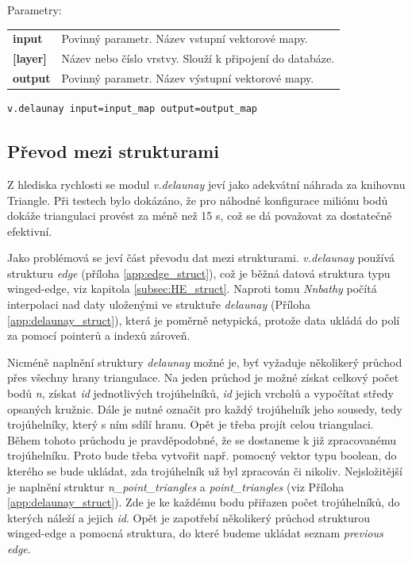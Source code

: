 \documentclass[12pt,a4paper]{article}
\begin{document}
\noindent Parametry:
\begin{tabular}{ll}
\textbf{input}& Povinný parametr. Název vstupní vektorové mapy.\\
\textbf{[layer]}& Název nebo číslo vrstvy. Slouží k připojení do databáze.\\
\textbf{output}&  Povinný parametr. Název výstupní vektorové mapy.\\
\end{tabular}

\begin{lstlisting}[caption={Volání modulu v.delaunay z příkazové řádky}]
v.delaunay input=input_map output=output_map
\end{lstlisting}

\bigskip
\subsection{Převod mezi strukturami}

Z hlediska rychlosti se modul \emph{v.delaunay} jeví jako adekvátní
náhrada za knihovnu Triangle. Při testech bylo dokázáno, že pro
náhodné konfigurace miliónu bodů dokáže triangulaci provést za méně
než 15 s, což se dá považovat za dostatečně efektivní. 

Jako problémová se jeví část převodu dat mezi
strukturami. \emph{v.delaunay} používá strukturu \emph{edge} (příloha \ref{app:edge_struct}),
což je běžná datová struktura typu winged-edge, viz kapitola \ref{subsec:HE_struct}. Naproti tomu \emph{Nnbathy} počítá interpolaci nad daty uloženými ve
struktuře \emph{delaunay} (Příloha \ref{app:delaunay_struct}), která
je poměrně netypická, protože data ukládá do polí za pomocí pointerů a
indexů zároveň.

Nicméně naplnění struktury \emph{delaunay} možné je, byť vyžaduje
několikerý průchod přes všechny hrany triangulace. Na jeden průchod je
možné získat celkový počet bodů \emph{n}, získat \emph{id}
jednotlivých trojúhelníků, \emph{id} jejich vrcholů a vypočítat středy
opsaných kružnic. Dále je nutné označit pro každý trojúhelník jeho
sousedy, tedy trojúhelníky, který s ním sdílí hranu. Opět je třeba
projít celou triangulaci. Během tohoto průchodu je pravděpodobné, že
se dostaneme k již zpracovanému trojúhelníku. Proto bude třeba
vytvořit např. pomocný vektor typu boolean, do kterého se bude
ukládat, zda trojúhelník už byl zpracován či nikoliv. Nejsložitější je
naplnění struktur \emph{n\_point\_triangles} a \emph{point\_triangles}
(viz Příloha \ref{app:delaunay_struct}). Zde je ke každému bodu
přiřazen počet trojúhelníků, do kterých náleží a jejich
\emph{id}. Opět je zapotřebí několikerý průchod strukturou winged-edge
a pomocná struktura, do které budeme ukládat seznam \emph{previous
  edge}.
\end{document}

